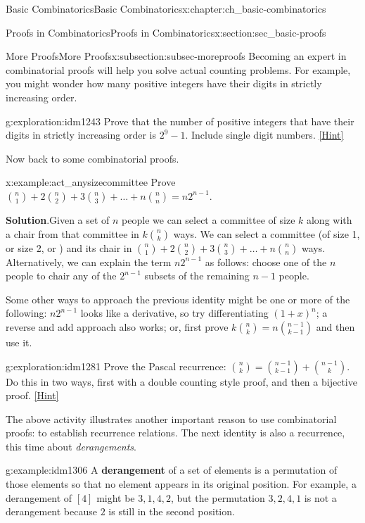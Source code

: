 \documentclass[oneside,10pt,]{book}
\newcommand{\terminology}[1]{\textbf{#1}}
\numberwithin{equation}{chapter}
\begin{document}
\begin{chapterptx}{Basic Combinatorics}{}{Basic Combinatorics}{}{}{x:chapter:ch_basic-combinatorics}
\begin{sectionptx}{Proofs in Combinatorics}{}{Proofs in Combinatorics}{}{}{x:section:sec_basic-proofs}
\begin{subsectionptx}{More Proofs}{}{More Proofs}{}{}{x:subsection:subsec-moreproofs}
Becoming an expert in combinatorial proofs will help you solve actual counting problems.  For example, you might wonder how many positive integers have their digits in strictly increasing order.%
\begin{exploration}{}{g:exploration:idm1243}%
Prove that the number of positive integers that have their digits in strictly increasing order is \(2^{9} - 1\). Include single digit numbers.%
\space\hspace*{0pt}\hfill{\tiny\hyperlink{g:hint:idm1247-back}{[Hint]}}\end{exploration}
Now back to some combinatorial proofs.%
\begin{example}{}{x:example:act_anysizecommittee}%
Prove \(\binom{n}{1} + 2 \binom{n}{2} + 3 \binom{n}{3} + \ldots + n \binom{n}{n} = n2^{n - 1}\).%
\par\smallskip%
\noindent\textbf{Solution}.\hypertarget{g:solution:idm1266}{}\quad{}Given a set of \(n\) people we can select a committee of size \(k\) along with a chair from that committee in \(k \binom{n}{k}\) ways. We can select a committee (of size 1, or size 2, or \textellipsis{}) and its chair in \(\binom{n}{1} + 2 \binom{n}{2} + 3 \binom{n}{3} + \ldots + n \binom{n}{n}\) ways. Alternatively, we can explain the term \(n2^{n - 1}\) as follows: choose one of the \(n\) people to chair any of the \(2^{n - 1}\) subsets of the remaining \(n - 1\) people.%
\end{example}
Some other ways to approach the previous identity might be one or more of the following: \(n2^{n - 1}\) looks like a derivative, so try differentiating \(\left( 1 + x \right)^{n}\); a reverse and add approach also works; or, first prove \(k \binom{n}{k} = n \binom{n - 1}{k - 1}\) and then use it.%
\begin{exploration}{}{g:exploration:idm1281}%
Prove the Pascal recurrence: \(\binom{n}{k} = \binom{n - 1}{k-1} + \binom{n - 1}{k}\).  Do this in two ways, first with a double counting style proof, and then a bijective proof.%
\space\hspace*{0pt}\hfill{\tiny\hyperlink{g:hint:idm1285-back}{[Hint]}}\end{exploration}
The above activity illustrates another important reason to use combinatorial proofs: to establish recurrence relations.  The next identity is also a recurrence, this time about \emph{derangements}.%
\begin{example}{}{g:example:idm1306}%
A \terminology{derangement} of a set of elements is a permutation of those elements so that no element appears in its original position.  For example, a derangement of \([4]\) might be \(3,1,4,2\), but the permutation \(3,2,4,1\) is not a derangement because \(2\) is still in the second position.%

\end{example}
\end{subsectionptx}
\end{sectionptx}
\end{chapterptx}
\end{document}
